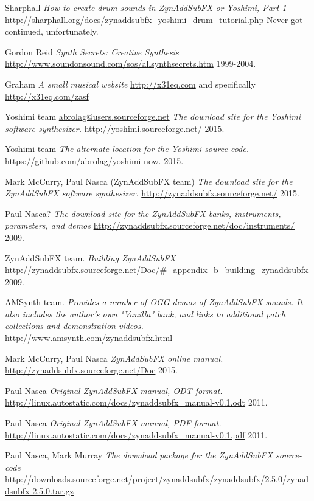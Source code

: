 \begin{thebibliography}{99}
   Sharphall
   \emph{How to create drum sounds in ZynAddSubFX or Yoshimi, Part 1}
   \url{http://sharphall.org/docs/zynaddsubfx\_yoshimi\_drum\_tutorial.php}
   Never got continued, unfortunately.

   Gordon Reid
   \emph{Synth Secrets:  Creative Synthesis}
   \url{http://www.soundonsound.com/sos/allsynthsecrets.htm}
   1999-2004.

   Graham
   \emph{A small musical website}
   \url{http://x31eq.com} and specifically
   \url{http://x31eq.com/zasf}

   Yoshimi team \url{abrolag@users.sourceforge.net}
   \emph{The download site for the Yoshimi software synthesizer.}
   \url{http://yoshimi.sourceforge.net/}
   2015.

   Yoshimi team
   \emph{The alternate location for the Yoshimi source-code.}
   \url{https://github.com/abrolag/yoshimi now.}
   2015.

   Mark McCurry, Paul Nasca (ZynAddSubFX team)
   \emph{The download site for the ZynAddSubFX software synthesizer.}
   \url{http://zynaddsubfx.sourceforge.net/}
   2015.

   Paul Nasca?
   \emph{The download site for the ZynAddSubFX banks, instruments,
      parameters, and demos}
   \url{http://zynaddsubfx.sourceforge.net/doc/instruments/}
   2009.

   ZynAddSubFX team.
   \emph{Building ZynAddSubFX}
   \url{http://zynaddsubfx.sourceforge.net/Doc/#_appendix_b_building_zynaddsubfx}
   2009.

   AMSynth team.
   \emph{Provides a number of OGG demos of ZynAddSubFX sounds. It
   also includes the author's own "Vanilla" bank, and links to additional
   patch collections and demonstration videos.}
   \url{http://www.amsynth.com/zynaddsubfx.html}

   Mark McCurry, Paul Nasca
   \emph{ZynAddSubFX online manual.}
   \url{http://zynaddsubfx.sourceforge.net/Doc}
   2015.

   Paul Nasca
   \emph{Original ZynAddSubFX manual, ODT format.}
   \url{http://linux.autostatic.com/docs/zynaddsubfx\_manual-v0.1.odt}
   2011.

   Paul Nasca
   \emph{Original ZynAddSubFX manual, PDF format.}
   \url{http://linux.autostatic.com/docs/zynaddsubfx\_manual-v0.1.pdf}
   2011.

   Paul Nasca, Mark Murray
   \emph{The download package for the ZynAddSubFX source-code}
   \url{http://downloads.sourceforge.net/project/zynaddsubfx/zynaddsubfx/2.5.0/zynaddsubfx-2.5.0.tar.gz}

\end{thebibliography}

